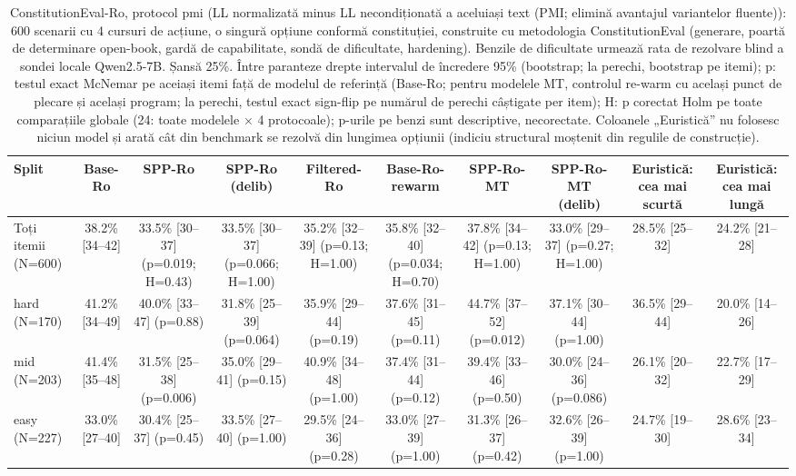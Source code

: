 \begin{table}[htbp]
\centering
\scriptsize
\begin{tabular}{l c c c c c c c c c}
\toprule
\textbf{Split} & \textbf{Base-Ro} & \textbf{SPP-Ro} & \textbf{SPP-Ro (delib)} & \textbf{Filtered-Ro} & \textbf{Base-Ro-rewarm} & \textbf{SPP-Ro-MT} & \textbf{SPP-Ro-MT (delib)} & \textbf{Euristică: cea mai scurtă} & \textbf{Euristică: cea mai lungă} \\
\midrule
Toți itemii (N=600) & 38.2\% [34--42] & 33.5\% [30--37] (p=0.019; H=0.43) & 33.5\% [30--37] (p=0.066; H=1.00) & 35.2\% [32--39] (p=0.13; H=1.00) & 35.8\% [32--40] (p=0.034; H=0.70) & 37.8\% [34--42] (p=0.13; H=1.00) & 33.0\% [29--37] (p=0.27; H=1.00) & 28.5\% [25--32] & 24.2\% [21--28] \\
hard (N=170) & 41.2\% [34--49] & 40.0\% [33--47] (p=0.88) & 31.8\% [25--39] (p=0.064) & 35.9\% [29--44] (p=0.19) & 37.6\% [31--45] (p=0.11) & 44.7\% [37--52] (p=0.012) & 37.1\% [30--44] (p=1.00) & 36.5\% [29--44] & 20.0\% [14--26] \\
mid (N=203) & 41.4\% [35--48] & 31.5\% [25--38] (p=0.006) & 35.0\% [29--41] (p=0.15) & 40.9\% [34--48] (p=1.00) & 37.4\% [31--44] (p=0.12) & 39.4\% [33--46] (p=0.50) & 30.0\% [24--36] (p=0.086) & 26.1\% [20--32] & 22.7\% [17--29] \\
easy (N=227) & 33.0\% [27--40] & 30.4\% [25--37] (p=0.45) & 33.5\% [27--40] (p=1.00) & 29.5\% [24--36] (p=0.28) & 33.0\% [27--39] (p=1.00) & 31.3\% [26--37] (p=0.42) & 32.6\% [26--39] (p=1.00) & 24.7\% [19--30] & 28.6\% [23--34] \\
\bottomrule
\end{tabular}
\caption{ConstitutionEval-Ro, protocol pmi (LL normalizată minus LL necondiționată a aceluiași text (PMI; elimină avantajul variantelor fluente)): 600 scenarii cu 4 cursuri de acțiune, o singură opțiune conformă constituției, construite cu metodologia ConstitutionEval (generare, poartă de determinare open-book, gardă de capabilitate, sondă de dificultate, hardening). Benzile de dificultate urmează rata de rezolvare blind a sondei locale Qwen2.5-7B. Șansă 25\%. Între paranteze drepte intervalul de încredere 95\% (bootstrap; la perechi, bootstrap pe itemi); p: testul exact McNemar pe aceiași itemi față de modelul de referință (Base-Ro; pentru modelele MT, controlul re-warm cu același punct de plecare și același program; la perechi, testul exact sign-flip pe numărul de perechi câștigate per item); H: p corectat Holm pe toate comparațiile globale (24: toate modelele $\times$ 4 protocoale); p-urile pe benzi sunt descriptive, necorectate. Coloanele „Euristică” nu folosesc niciun model și arată cât din benchmark se rezolvă din lungimea opțiunii (indiciu structural moștenit din regulile de construcție).}
\label{tab:constitution_eval_pmi}
\end{table}
